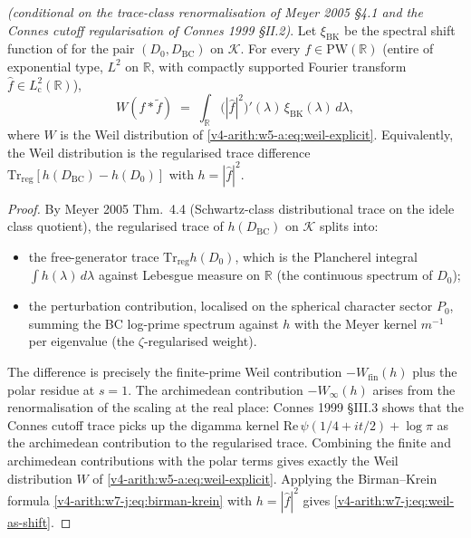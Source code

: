 \begin{theorem}
\label{v4-arith:w7-j:thm:weil-as-shift}
\ClaimStatusProvedHereConditional \emph{(conditional on the trace-class
renormalisation of Meyer 2005 \S4.1 and the Connes cutoff regularisation
of Connes 1999 \S II.2)}. Let \(\xi_{\mathrm{BK}}\) be the spectral
shift function of
 for the pair
\((D_{0},D_{\mathrm{BC}})\) on \(\mathcal{K}\). For every
\(f\in\mathrm{PW}(\mathbb{R})\) (entire of exponential type, \(L^2\)
on \(\mathbb{R}\), with compactly supported Fourier transform
\(\widehat{f}\in L^{2}_{\mathrm{c}}(\mathbb{R})\)),
\begin{equation}
\label{v4-arith:w7-j:eq:weil-as-shift}
W(f*\widetilde{f})\;=\;\int_{\mathbb{R}}\bigl(|\widehat{f}|^{2}\bigr)'(\lambda)\,\xi_{\mathrm{BK}}(\lambda)\,d\lambda,
\end{equation}
where \(W\) is the Weil distribution of
\eqref{v4-arith:w5-a:eq:weil-explicit}. Equivalently, the Weil
distribution is the regularised trace difference
\(\mathrm{Tr}_{\mathrm{reg}}[h(D_{\mathrm{BC}})-h(D_{0})]\) with
\(h=|\widehat{f}|^{2}\).
\end{theorem}

\begin{proof}
By Meyer 2005 Thm.~4.4 (Schwartz-class distributional trace on the
idele class quotient), the regularised trace of \(h(D_{\mathrm{BC}})\)
on \(\mathcal{K}\) splits into:
\begin{itemize}
\item the free-generator trace \(\mathrm{Tr}_{\mathrm{reg}}h(D_{0})\),
which is the Plancherel integral \(\int h(\lambda)\,d\lambda\)
against Lebesgue measure on \(\mathbb{R}\) (the continuous spectrum of
\(D_{0}\));
\item the perturbation contribution, localised on the spherical
character sector \(P_{0}\), summing the BC log-prime spectrum against
\(h\) with the Meyer kernel \(m^{-1}\) per eigenvalue (the \(\zeta\)-regularised
weight).
\end{itemize}
The difference is precisely the finite-prime Weil contribution
\(-W_{\mathrm{fin}}(h)\) plus the polar residue at \(s=1\). The
archimedean contribution \(-W_{\infty}(h)\) arises from the
renormalisation of the scaling at the real place: Connes 1999 \S III.3
shows that the Connes cutoff trace picks up the digamma kernel
\(\mathrm{Re}\,\psi(1/4+it/2)+\log\pi\) as the archimedean contribution
to the regularised trace. Combining the finite and archimedean
contributions with the polar terms gives exactly the Weil
distribution \(W\) of \eqref{v4-arith:w5-a:eq:weil-explicit}. Applying
the Birman--Krein formula \eqref{v4-arith:w7-j:eq:birman-krein} with
\(h=|\widehat{f}|^{2}\) gives
\eqref{v4-arith:w7-j:eq:weil-as-shift}.
\end{proof}

